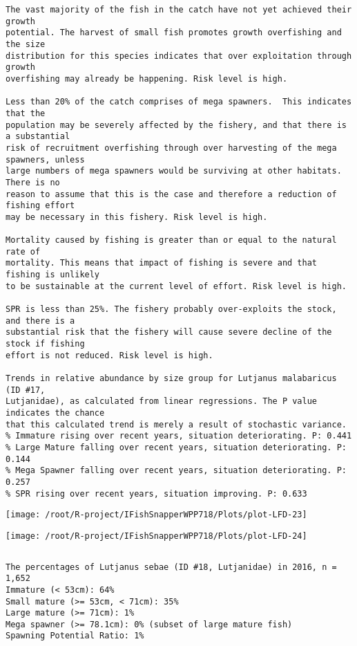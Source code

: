 \documentclass{report}\usepackage[]{graphicx}\usepackage[]{color}
\makeatletter
\def\maxwidth{ %
  \ifdim\Gin@nat@width>\linewidth
    \linewidth
  \else
    \Gin@nat@width
  \fi
}
\newenvironment{kframe}{%
 \def\at@end@of@kframe{}%
 \ifinner\ifhmode%
  \def\at@end@of@kframe{\end{minipage}}%
  \begin{minipage}{\columnwidth}%
 \fi\fi%
 \def\FrameCommand##1{\hskip\@totalleftmargin \hskip-\fboxsep
 \colorbox{shadecolor}{##1}\hskip-\fboxsep
     \hskip-\linewidth \hskip-\@totalleftmargin \hskip\columnwidth}%
 \MakeFramed {\advance\hsize-\width
   \@totalleftmargin\z@ \linewidth\hsize
   \@setminipage}}%
 {\par\unskip\endMakeFramed%
 \at@end@of@kframe}
\newenvironment{knitrout}{}{} %
\makeatother
\begin{document}
\begin{knitrout}
\begin{kframe}
\begin{verbatim}
The vast majority of the fish in the catch have not yet achieved their growth
potential. The harvest of small fish promotes growth overfishing and the size
distribution for this species indicates that over exploitation through growth
overfishing may already be happening. Risk level is high.

Less than 20% of the catch comprises of mega spawners.  This indicates that the
population may be severely affected by the fishery, and that there is a substantial
risk of recruitment overfishing through over harvesting of the mega spawners, unless
large numbers of mega spawners would be surviving at other habitats. There is no
reason to assume that this is the case and therefore a reduction of fishing effort
may be necessary in this fishery. Risk level is high.
 
Mortality caused by fishing is greater than or equal to the natural rate of
mortality. This means that impact of fishing is severe and that fishing is unlikely
to be sustainable at the current level of effort. Risk level is high.
 
SPR is less than 25%. The fishery probably over-exploits the stock, and there is a
substantial risk that the fishery will cause severe decline of the stock if fishing
effort is not reduced. Risk level is high.
 
Trends in relative abundance by size group for Lutjanus malabaricus (ID #17,
Lutjanidae), as calculated from linear regressions. The P value indicates the chance
that this calculated trend is merely a result of stochastic variance.
% Immature rising over recent years, situation deteriorating. P: 0.441
% Large Mature falling over recent years, situation deteriorating. P: 0.144
% Mega Spawner falling over recent years, situation deteriorating. P: 0.257
% SPR rising over recent years, situation improving. P: 0.633
\end{verbatim}
\end{kframe}
\texttt{[image: /root/R-project/IFishSnapperWPP718/Plots/plot-LFD-23]} 

\texttt{[image: /root/R-project/IFishSnapperWPP718/Plots/plot-LFD-24]} 
\begin{kframe}\begin{verbatim}
\end{verbatim}
\end{kframe}
\clearpage
\newpage
\begin{kframe}\begin{verbatim}The percentages of Lutjanus sebae (ID #18, Lutjanidae) in 2016, n = 1,652
Immature (< 53cm): 64%
Small mature (>= 53cm, < 71cm): 35%
Large mature (>= 71cm): 1%
Mega spawner (>= 78.1cm): 0% (subset of large mature fish)
Spawning Potential Ratio: 1%
 

\end{verbatim}
\end{kframe}
\end{knitrout}
\end{document}
